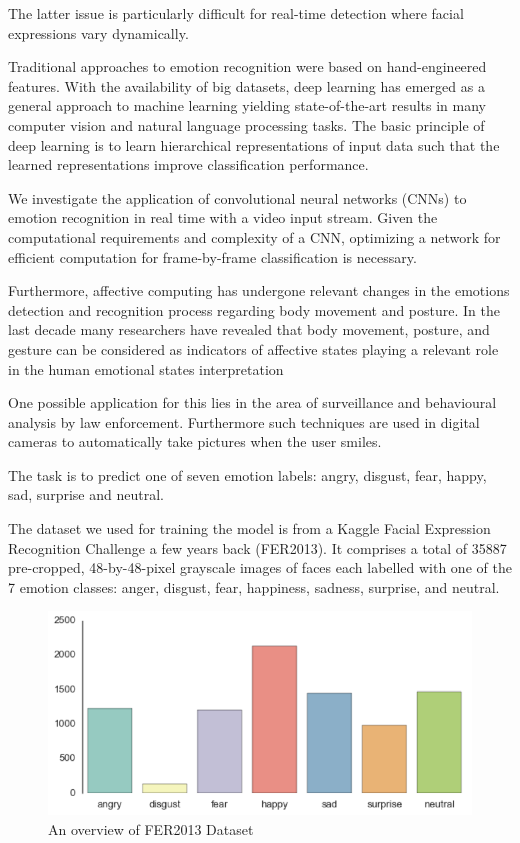 The latter issue is particularly difficult for real-time detection where facial expressions vary dynamically.

Traditional approaches to emotion recognition were based on hand-engineered features. With the availability of big datasets, deep learning has emerged as a general approach to machine learning yielding state-of-the-art results in many computer vision and natural language processing tasks. The basic principle of deep learning is to learn hierarchical representations of input data such that the learned representations improve classification performance. 

We investigate the application of convolutional neural networks (CNNs) to emotion recognition in real time with a video input stream. Given the computational requirements and complexity of a CNN, optimizing a network for efficient computation for frame-by-frame classification is necessary.

Furthermore, affective computing has undergone relevant changes in the emotions detection and recognition process regarding body movement and posture. In the last decade many researchers have revealed that body movement, posture, and gesture can be considered as indicators of affective states playing a relevant role in the human emotional states interpretation

One possible application for this lies in the area of surveillance and behavioural analysis by law enforcement. Furthermore such techniques are used in digital cameras to automatically take pictures when the user smiles.

The task is to predict one of seven emotion labels: angry, disgust, fear, happy, sad, surprise and neutral.

The dataset we used for training the model is from a Kaggle Facial Expression Recognition Challenge a few years back (FER2013). It comprises a total of 35887 pre-cropped, 48-by-48-pixel grayscale images of faces each labelled with one of the 7 emotion classes: anger, disgust, fear, happiness, sadness, surprise, and neutral.

\begin{figure}[h]
	\centering\includegraphics{images/fer2013.png}
	\caption{An overview of FER2013 Dataset}
\end{figure}

